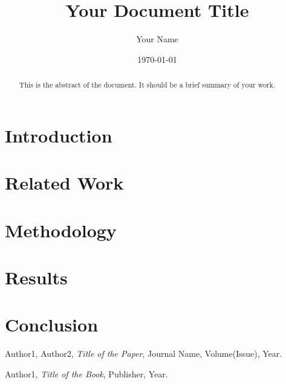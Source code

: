 \documentclass[a4paper,12pt]{article}  %
\title{Your Document Title}
\author{Your Name}
\date{\today}  %
\begin{document}
\maketitle
\newpage

\begin{abstract}
    This is the abstract of the document. It should be a brief summary of your work.
\end{abstract}
\newpage

\tableofcontents
\newpage


\section{Introduction}
\lipsum[1-3]  %

\section{Related Work}
\lipsum[4-6]

\section{Methodology}
\lipsum[7-9]

\section{Results}
\lipsum[10-12]

\section{Conclusion}
\lipsum[13]


\newpage
\begin{thebibliography}{9}
    Author1, Author2, \textit{Title of the Paper}, Journal Name, Volume(Issue), Year.

    Author1, \textit{Title of the Book}, Publisher, Year.

\end{thebibliography}
\end{document}
